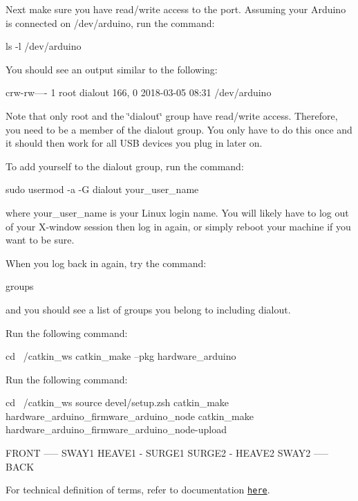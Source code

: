 Next make sure you have read/write access to the port. Assuming your Arduino is connected on {\ttfamily /dev/arduino}, run the command\+:


\begin{DoxyCode}
ls -l /dev/arduino
\end{DoxyCode}
 You should see an output similar to the following\+: 
\begin{DoxyCode}
crw-rw---- 1 root dialout 166, 0 2018-03-05 08:31 /dev/arduino
\end{DoxyCode}


Note that only root and the \char`\"{}dialout\char`\"{} group have read/write access. Therefore, you need to be a member of the dialout group. You only have to do this once and it should then work for all U\+SB devices you plug in later on.

To add yourself to the dialout group, run the command\+: 
\begin{DoxyCode}
sudo usermod -a -G dialout your\_user\_name
\end{DoxyCode}
 where {\ttfamily your\+\_\+user\+\_\+name} is your Linux login name. You will likely have to log out of your X-\/window session then log in again, or simply reboot your machine if you want to be sure.

When you log back in again, try the command\+: 
\begin{DoxyCode}
groups
\end{DoxyCode}
 and you should see a list of groups you belong to including dialout.

Run the following command\+: 
\begin{DoxyCode}
cd ~/catkin\_ws
catkin\_make --pkg hardware\_arduino
\end{DoxyCode}


Run the following command\+: 
\begin{DoxyCode}
cd ~/catkin\_ws
source devel/setup.zsh
catkin\_make hardware\_arduino\_firmware\_arduino\_node    
catkin\_make hardware\_arduino\_firmware\_arduino\_node-upload     
\end{DoxyCode}



\begin{DoxyCode}
        FRONT
        -----
        SWAY1
        HEAVE1
          -
SURGE1           SURGE2
          -
        HEAVE2
        SWAY2
        -----
        BACK
\end{DoxyCode}


For technical definition of terms, refer to documentation \href{https://en.wikipedia.org/wiki/Ship_motions}{\tt here}.

